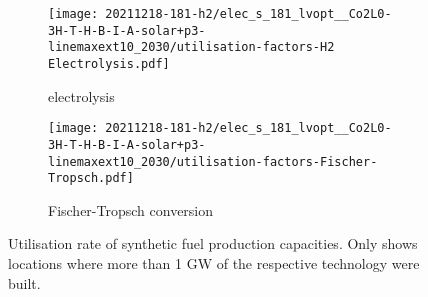 \begin{figure}
    \centering
    \begin{subfigure}{0.66\textwidth}
        \centering
        \caption{electrolysis}
        \texttt{[image: 20211218-181-h2/elec\_s\_181\_lvopt\_\_Co2L0-3H-T-H-B-I-A-solar+p3-linemaxext10\_2030/utilisation-factors-H2 Electrolysis.pdf]}
    \end{subfigure}
    \begin{subfigure}{0.66\textwidth}
        \centering
        \caption{Fischer-Tropsch conversion}
        \texttt{[image: 20211218-181-h2/elec\_s\_181\_lvopt\_\_Co2L0-3H-T-H-B-I-A-solar+p3-linemaxext10\_2030/utilisation-factors-Fischer-Tropsch.pdf]}
    \end{subfigure}
    \caption{Utilisation rate of synthetic fuel production capacities. Only shows locations where more than 1 GW of the respective technology were built.}
    \label{fig:si:utilisation-rate-map}
\end{figure}

